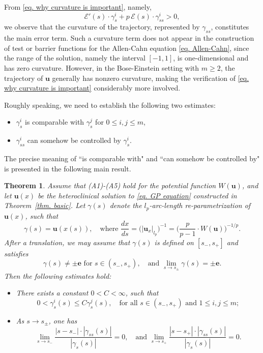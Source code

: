 \documentclass[11pt,twoside,reqno]{amsart}
\newcounter{assu}
\newtheorem{theorem}{Theorem}[section]
\numberwithin{equation}{section}
\begin{document}
From \eqref{eq. why curvature is important}, namely,
\begin{equation*}
    \mathcal{E}'(s)\cdot\gamma_s^i
    +p\,\mathcal{E}(s)\cdot\gamma_{ss}^i>0,
\end{equation*}
we observe that the curvature of the trajectory, represented by $\gamma_{ss}$, constitutes the main error term. Such a curvature term does not appear in the construction of test or barrier functions for the Allen-Cahn equation \eqref{eq. Allen-Cahn}, since the range of the solution, namely the interval $[-1,1]$, is one-dimensional and has zero curvature. However, in the Bose-Einstein setting with $m\geq2$, the trajectory of $\mathbf{u}$ generally has nonzero curvature, making the verification of \eqref{eq. why curvature is important} considerably more involved.

Roughly speaking, we need to establish the following two estimates:
\begin{itemize}
    \item $\gamma^{i}_{s}$ is comparable with $\gamma^{j}_{s}$ for $0\leq i,j\leq m$,
    \item $\gamma^{i}_{ss}$ can somehow be controlled by $\gamma^{i}_{s}$.
\end{itemize}
The precise meaning of ``is comparable with" and ``can somehow be controlled by" is presented in the following main result.
\begin{theorem}\label{thm. main}
    Assume that (A1)-(A5) hold for the potential function $W(\mathbf{u})$, and let $\mathbf{u}(x)$ be the heteroclinical solution to \eqref{eq. GP equation} constructed in Theorem~\ref{thm. basic}. Let $\gamma(s)$ denote the $l_{p}$-arc-length re-parametrization of $\mathbf{u}(x)$, such that
    \begin{equation*}
        \gamma(s)=\mathbf{u}(x(s)),\quad\mbox{where }\frac{dx}{ds}=\Big(|\mathbf{u}_{x}|_{l_{p}}\Big)^{-1}=\Big(\frac{p}{p-1}\cdot W(\mathbf{u})\Big)^{-1/p}.
    \end{equation*}
       After a translation, we may assume that $\gamma(s)$ is defined on $[s_-,s_+]$ and satisfies
    \begin{equation*}
        \gamma(s)\neq\pm\mathbf{e}\mbox{ for }s\in(s_{-},s_{+}),\quad\mbox{and }\lim_{s\to s_{\pm}}\gamma(s)=\pm\mathbf{e}.
    \end{equation*}
    Then the following estimates hold:
    \begin{itemize}
        \item[(1)] There exists a constant $0<C<\infty$, such that
        \begin{equation*}
            0<\gamma^{i}_{s}(s)\leq C\gamma^{j}_{s}(s),\quad\mbox{for all }s\in(s_{-},s_{+})\mbox{ and }1\leq i,j\leq m;
        \end{equation*}
        \item[(2)] As $s\to s_{\pm}$, one has
        \begin{equation*}
            \lim_{s\to s_{-}}\frac{|s-s_{-}|\cdot|\gamma_{ss}(s)|}{|\gamma_{s}(s)|}=0,\quad\mbox{and }\lim_{s\to s_{+}}\frac{|s-s_{+}|\cdot|\gamma_{ss}(s)|}{|\gamma_{s}(s)|}=0.
        \end{equation*}
    \end{itemize}
\end{theorem}
\end{document}
